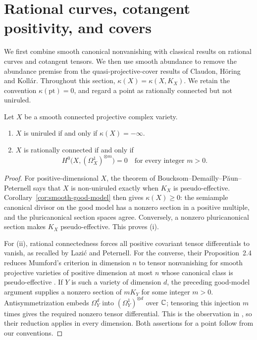 \section{Rational curves, cotangent positivity, and covers}
\label{sec:classification}

We first combine smooth canonical nonvanishing with classical results on
rational curves and cotangent tensors. We then use smooth abundance to
remove the abundance premise from the quasi-projective-cover results of
Claudon, H\"oring and Koll\'ar. Throughout this section,
\(\kappa(X)=\kappa(X,K_X)\). We retain the convention
\(\kappa(\mathrm{pt})=0\), and regard a point as rationally connected
but not uniruled.

\begin{corollary}
\label{cor:uniruled-mumford}
Let \(X\) be a smooth connected projective complex variety.
\begin{enumerate}[label=\textup{(\roman*)}]
\item \(X\) is uniruled if and only if \(\kappa(X)=-\infty\).
\item \(X\) is rationally connected if and only if
\[
 H^0\bigl(X,(\Omega_X^1)^{\otimes m}\bigr)=0
 \quad\text{for every integer }m>0.
\]
\end{enumerate}
\end{corollary}
\begin{proof}
For positive-dimensional \(X\), the theorem of
Boucksom--Demailly--P{\u a}un--Peternell
\cite[Corollary~0.3 and Theorem~2.6]{BDPP2013} says that \(X\) is
non-uniruled exactly when \(K_X\) is pseudo-effective.
Corollary~\ref{cor:smooth-good-model} then gives \(\kappa(X)\geq0\):
the semiample canonical divisor on the good model has a nonzero section
in a positive multiple, and the pluricanonical section spaces agree.
Conversely, a nonzero pluricanonical section makes \(K_X\) pseudo-effective. This proves
\textup{(i)}.

For \textup{(ii)}, rational connectedness forces all positive covariant
tensor differentials to vanish, as recalled by Lazi{\'c} and Peternell.
For the converse, their Proposition~2.4 reduces Mumford's criterion in
dimension \(n\) to tensor nonvanishing for smooth projective varieties
of positive dimension at most \(n\) whose canonical class is
pseudo-effective \cite[Proposition~2.4]{LazicPeternell2017}.
If \(Y\) is such a variety of dimension \(d\), the preceding good-model
argument supplies a nonzero section of \(mK_Y\) for some integer \(m>0\).
Antisymmetrization embeds
\(\Omega_Y^d\) into \((\Omega_Y^1)^{\otimes d}\) over \(\mathbb{C}\);
tensoring this injection \(m\) times gives the required nonzero tensor
differential. This is the observation in
\cite[Remark~2.5]{LazicPeternell2017}, so their reduction applies in
every dimension. Both assertions for a point follow from our conventions.
\end{proof}

